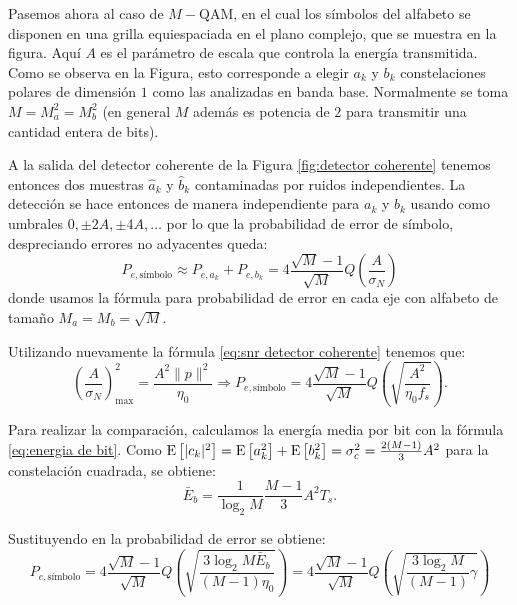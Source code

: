 \begin{ejemplo}[$M-$QAM]

    Pasemos ahora al caso de $M-$QAM, en el cual los símbolos del alfabeto se disponen en una grilla equiespaciada en el plano complejo, que se muestra en la figura. Aquí $A$ es el parámetro de escala que controla la energía transmitida. Como se observa en la Figura, esto corresponde a elegir $a_k$ y $b_k$ constelaciones polares de dimensión $1$ como las analizadas en banda base. Normalmente se toma $M=M_a^2=M_b^2$ (en general $M$ además es potencia de $2$ para transmitir una cantidad entera de bits).

    A la salida del detector coherente de la Figura \ref{fig:detector coherente} tenemos entonces dos muestras $\hat{a}_k$ y $\hat{b}_k$ contaminadas por ruidos independientes. La detección se hace entonces de manera independiente para $a_k$ y $b_k$ usando como umbrales $0,\pm 2A,\pm 4A,\ldots$ por lo que la probabilidad de error de símbolo, despreciando errores no adyacentes queda:
    \begin{equation*}
        P_{e,\text{símbolo}} \approx P_{e,a_k} + P_{e,b_k} = 4\frac{\sqrt{M}-1}{\sqrt{M}} Q\left(\frac{A}{\sigma_N}\right)
    \end{equation*}
    donde usamos la fórmula para probabilidad de error en cada eje con alfabeto de tamaño $M_a=M_b=\sqrt{M}$.

    Utilizando nuevamente la fórmula \eqref{eq:snr detector coherente} tenemos que:
    \begin{equation*}
        \left(\frac{A}{\sigma_N}\right)_{\max}^2 = \frac{A^2\|p\|^2}{\eta_0} \Rightarrow P_{e,\text{símbolo}} = 4\frac{\sqrt{M}-1}{\sqrt{M}} Q\left(\sqrt{\frac{A^2}{\eta_0 f_s}}\right).
    \end{equation*}

    Para realizar la comparación, calculamos la energía media por bit con la fórmula \eqref{eq:energia de bit}. Como $\mathrm{E}\left[|c_k|^2\right] = \mathrm{E}\left[a_k^2\right]+\mathrm{E}\left[b_k^2\right] = \sigma_c^2 = \frac{2(M-1)}{3}A^2$ para la constelación cuadrada, se obtiene:
    \begin{equation*}
        \bar{E}_b = \frac{1}{\log_2 M} \frac{M-1}{3}A^2T_s.
    \end{equation*}

    Sustituyendo en la probabilidad de error se obtiene:
    \begin{equation*}
        P_{e,\text{símbolo}} = 4\frac{\sqrt{M}-1}{\sqrt{M}} Q\left(\sqrt{\frac{3\log_2M\bar{E}_b}{(M-1)\eta_0}}\right) = 4\frac{\sqrt{M}-1}{\sqrt{M}} Q\left(\sqrt{\frac{3\log_2M }{(M-1)}\gamma}\right) 
    \end{equation*}


\end{ejemplo}
